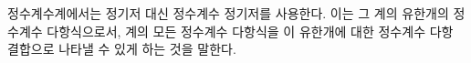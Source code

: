 
정수계수계에서는 정기저 대신 정수계수 정기저를 사용한다. 이는 그 계의 유한개의 정수계수 다항식으로서, 계의 모든 정수계수 다항식을 이 유한개에 대한 정수계수 다항 결합으로 나타낼 수 있게 하는 것을 말한다.

